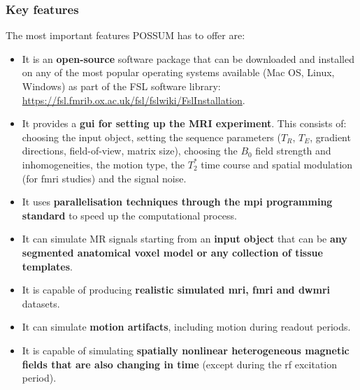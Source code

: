 \subsubsection{Key features}
The most important features POSSUM has to offer are:
\begin{itemize}
    
    \item It is an \textbf{open-source} software package that can be downloaded and installed on any of the most popular operating systems available (Mac OS, Linux, Windows) as part of the FSL software library: \url{https://fsl.fmrib.ox.ac.uk/fsl/fslwiki/FslInstallation}.
    
    \item It provides a \textbf{\ac{gui} for setting up the MRI experiment}.
    This consists of: choosing the input object, setting the sequence parameters ($T_R$, $T_E$, gradient directions, field-of-view, matrix size), choosing the $B_0$ field strength and inhomogeneities, the motion type, the $T_2^*$ time course and spatial modulation (for \ac{fmri} studies) and the signal noise.
    
    \item It uses \textbf{parallelisation techniques through the \ac{mpi} programming standard} to speed up the computational process.
    
    \item It can simulate MR signals starting from an \textbf{input object} that can be  \textbf{any segmented anatomical voxel model or any collection of tissue templates}. 
    
    \item It is capable of producing \textbf{realistic simulated \ac{mri}, \ac{fmri} and \ac{dwmri}} datasets.
    
    \item It can simulate \textbf{motion artifacts}, including motion during readout periods.
    
    \item It is capable of simulating \textbf{spatially nonlinear heterogeneous magnetic fields that are also changing in time} (except during the \ac{rf} excitation period).
    
\end{itemize}

\hfill

